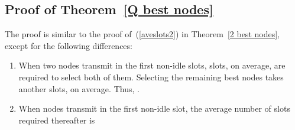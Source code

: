 \documentclass[12pt,draftcls,peerreview, onecolumn]{IEEEtran}
\newcommand{\eqn}[1]{(\ref{#1})}
\begin{document}
\subsection{Proof of Theorem~\ref{Q best nodes}}
\label{proof of Q best nodes}
The proof is similar to the proof of~\eqn{aveslots2} in Theorem~\ref{2
  best nodes}, except for the following differences:
\begin{enumerate}

\item When two nodes transmit in the first non-idle slots,
   slots, on average, are required to select both of
  them.  Selecting the remaining best  nodes takes another
   slots, on average.  Thus,
  .

\item When  nodes transmit in the first non-idle slot, the
  average number of slots required thereafter is

\end{enumerate}




\end{document}

